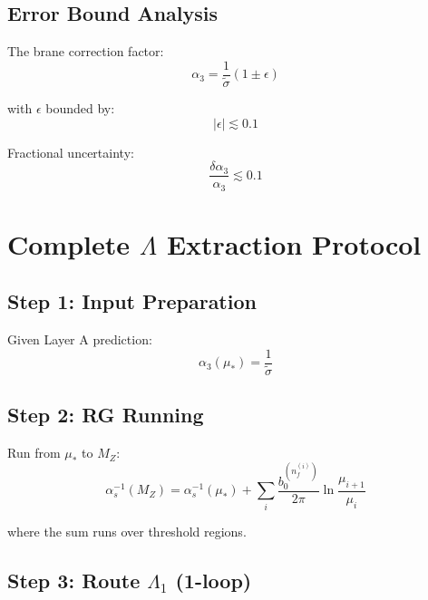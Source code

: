 \documentclass[11pt,a4paper]{article}
\theoremstyle{definition}
\begin{document}
\subsection{Error Bound Analysis}
\label{subsec:app-error-bound}

The brane correction factor:
\begin{equation}
\label{eq:app-69}
\alpha_3 = \frac{1}{\tilde{\sigma}}(1 \pm \epsilon)
\end{equation}

with $\epsilon$ bounded by:
\begin{equation}
\label{eq:app-70}
|\epsilon| \lesssim 0.1
\end{equation}

Fractional uncertainty:
\begin{equation}
\label{eq:app-71}
\frac{\delta\alpha_3}{\alpha_3} \lesssim 0.1
\end{equation}

\section{Complete $\Lambda$ Extraction Protocol}
\label{app:lambda-protocol}

\subsection{Step 1: Input Preparation}
\label{subsec:app-step1}

Given Layer A prediction:
\begin{equation}
\label{eq:app-72}
\alpha_3(\mu_*) = \frac{1}{\tilde{\sigma}}
\end{equation}

\subsection{Step 2: RG Running}
\label{subsec:app-step2}

Run from $\mu_*$ to $M_Z$:
\begin{equation}
\label{eq:app-73}
\alpha_s^{-1}(M_Z) = \alpha_s^{-1}(\mu_*) + \sum_{i} \frac{b_0^{(n_f^{(i)})}}{2\pi}\ln\frac{\mu_{i+1}}{\mu_i}
\end{equation}

where the sum runs over threshold regions.

\subsection{Step 3: Route $\Lambda_1$ (1-loop)}
\label{subsec:app-step3}
\end{document}
